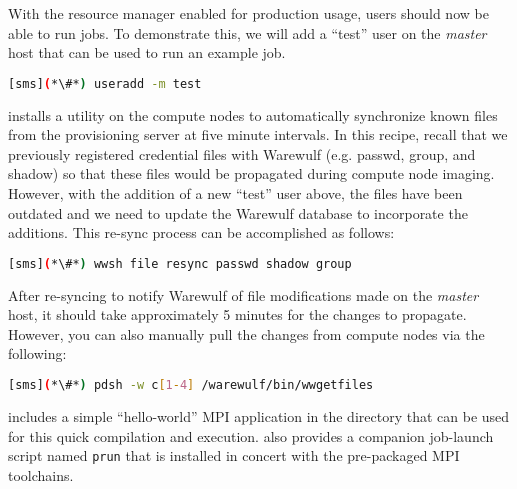 With the resource manager enabled for production usage, users should now be
able to run jobs. To demonstrate this, we will add a ``test'' user on the {\em master}
host that can be used to run an example job.

\begin{lstlisting}[language=bash,keywords={}]
[sms](*\#*) useradd -m test
\end{lstlisting}

\Warewulf{} installs a utility on the compute nodes to automatically 
synchronize known files from the provisioning server at five minute intervals. In this
recipe, recall that we previously registered credential files with Warewulf (e.g. passwd,
group, and shadow) so that these files would be propagated during compute node
imaging. However, with the addition of a new ``test'' user above, the files
have been outdated and we need to update the Warewulf database to incorporate
the additions. This re-sync process can be accomplished as follows:

\begin{lstlisting}[language=bash,keywords={}]
[sms](*\#*) wwsh file resync passwd shadow group
\end{lstlisting}


\begin{center}
\begin{tcolorbox}[]
\small
After re-syncing to notify Warewulf of file modifications made on the {\em
master} host, it should take approximately 5 minutes for the changes to
propagate. However, you can also manually pull the changes from compute nodes
via the following:
\begin{lstlisting}[language=bash,keywords={}]
[sms](*\#*) pdsh -w c[1-4] /warewulf/bin/wwgetfiles 
\end{lstlisting}
\end{tcolorbox}
\end{center}


\OHPC{} includes a simple ``hello-world'' MPI application in the
 directory that can be used for this quick
compilation and execution. \OHPC{} also provides a companion job-launch script
named \texttt{prun} that is installed in concert with the pre-packaged MPI
toolchains.

